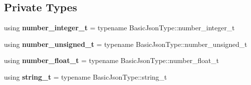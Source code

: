 \subsection*{Private Types}
\begin{DoxyCompactItemize}
\item 
\mbox{\label{classnlohmann_1_1detail_1_1lexer_a9cd1b11cc67edbfb2613c788b5bd337c}} 
using {\bfseries number\+\_\+integer\+\_\+t} = typename Basic\+Json\+Type\+::number\+\_\+integer\+\_\+t
\item 
\mbox{\label{classnlohmann_1_1detail_1_1lexer_a105d1dfeab414a572655895cdd96a52a}} 
using {\bfseries number\+\_\+unsigned\+\_\+t} = typename Basic\+Json\+Type\+::number\+\_\+unsigned\+\_\+t
\item 
\mbox{\label{classnlohmann_1_1detail_1_1lexer_aa7f9e7b2bcd311fb86e2da43761a6619}} 
using {\bfseries number\+\_\+float\+\_\+t} = typename Basic\+Json\+Type\+::number\+\_\+float\+\_\+t
\item 
\mbox{\label{classnlohmann_1_1detail_1_1lexer_ab63d35c658887592a4b09ad26eb4c795}} 
using {\bfseries string\+\_\+t} = typename Basic\+Json\+Type\+::string\+\_\+t
\end{DoxyCompactItemize}
